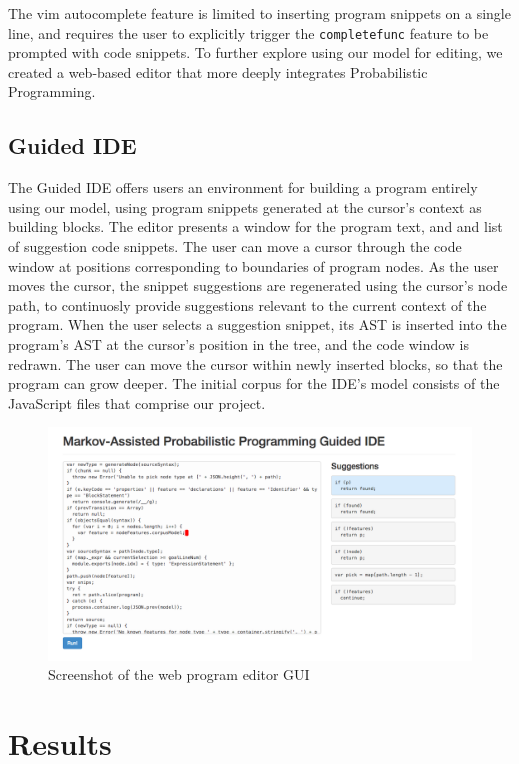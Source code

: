 \documentclass{article}
\begin{document}
The vim autocomplete feature is limited to inserting program snippets on a single
line, and requires the user to explicitly trigger the \texttt{completefunc}
feature to be prompted with code snippets. To further explore using our model
for editing, we created a web-based editor that more deeply integrates Probabilistic
Programming.

\subsection{Guided IDE}

The Guided IDE offers users an environment for building a program entirely using
our model, using program snippets generated at the cursor's context as building
blocks. The editor presents a window for the program text, and and list of
suggestion code snippets. The user can move a cursor through the code window at
positions corresponding to boundaries of program nodes. As the user moves the
cursor, the snippet suggestions are regenerated using the cursor's node path, to
continuosly provide suggestions relevant to the current context of the program. When the
user selects a suggestion snippet, its AST is inserted into the program's AST at
the cursor's position in the tree, and the code window is redrawn. The user can
move the cursor within newly inserted blocks, so that the program can grow
deeper. The initial corpus for the IDE's model consists of the JavaScript files
that comprise our project.

\begin{figure}[h]
  \centering
  \includegraphics[width=1.00\textwidth]{screenshot}
  \caption{Screenshot of the web program editor GUI} \label{fig:screenshot}
\end{figure}

\section{Results}
\end{document}
